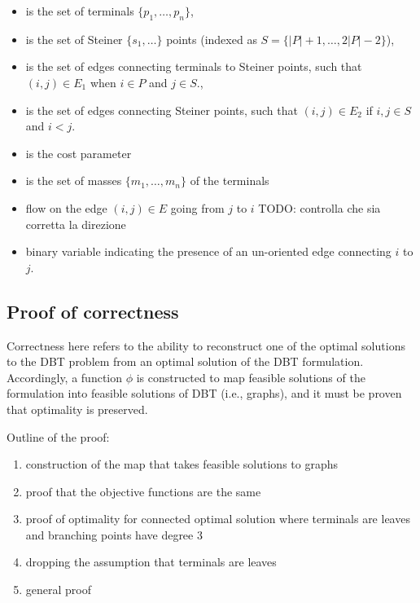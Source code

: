 \documentclass[12pt,a4paper]{article}
\newenvironment{itemizeb}
{\begin{itemize}
     \itemsep=2pt}{
\end{itemize}}
\numberwithin{equation}{section}
\theoremstyle{mytheorem}
\theoremstyle{myremark}
\theoremstyle{myparagraph}
\begin{document}
    \begin{itemizeb}
         cm=.3 cm
        \item [$P$] is the set of terminals $\{p_1, \ldots, p_n\}$,
        \item [$S$] is the set of Steiner $\{s_1, \ldots\}$ points (indexed as $S = \{|P| + 1, \dots, 2|P|-2\}$),
        \item [$E_1$] is the set of edges connecting terminals to Steiner points, such that $(i,j) \in E_1$ when $i \in P$ and $j \in S$.,
        \item [$E_2$] is the set of edges connecting Steiner points, such that $(i,j) \in E_2$ if $i,j \in S$ and $i < j$.
    \end{itemizeb}

    \begin{itemizeb}
         cm=.3 cm
        \item[$\alpha \in (0,1)$] is the cost parameter
        \item [$M$] is the set of masses $\{m_1, \ldots, m_n\}$ of the terminals
        \item [$f_{ij}$] flow on the edge $(i, j) \in E$ going from $j$ to $i$  {TODO: controlla che sia corretta la direzione}
        \item [$y_{ij}$] binary variable indicating the presence of an un-oriented edge connecting $i$ to $j$.
    \end{itemizeb}


    \subsection{Proof of correctness}

    Correctness here refers to the ability to reconstruct one of the optimal solutions to the DBT problem from an optimal solution of the DBT formulation. 
    Accordingly, a function $\phi$ is constructed to map feasible solutions of the formulation into feasible solutions of DBT (i.e., graphs), 
    and it must be proven that optimality is preserved.

    Outline of the proof:
    \begin{enumerate}
        \item construction of the map that takes feasible solutions to graphs
        \item proof that the objective functions are the same
        \item proof of optimality for connected optimal solution where terminals are leaves and branching points have degree 3
        \item dropping the assumption that terminals are leaves
        \item general proof
    \end{enumerate}
\end{document}
